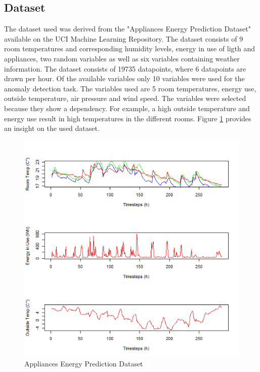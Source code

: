 \subsection{Dataset}
The dataset used was derived from the "Appliances Energy Prediction Dataset" available on the UCI Machine Learning Repository. The dataset consists of 9 room temperatures and corresponding humidity levels, energy in use of ligth and appliances, two random variables as well as six variables containing weather information. The dataset consists of 19735 datapoints, where 6 datapoints are drawn per hour. Of the available variables only 10 variables were used for the anomaly detection task. The variables used are 5 room temperatures, energy use, outside temperature, air pressure and wind speed. The variables were selected because they show a dependency. For example, a high outside temperature and energy use result in high temperatures in the different rooms. Figure \ref{fig:temp_dataset} provides an insight on the used dataset.


\begin{figure}[h]
	\centering
	\includegraphics[scale=0.6]{Figures/temp_dataset}
	\decoRule
	\caption[Temperature Dataset]{Appliances Energy Prediction Dataset \parencite{Own or UCI???}}
	\label{fig:temp_dataset}
\end{figure}

